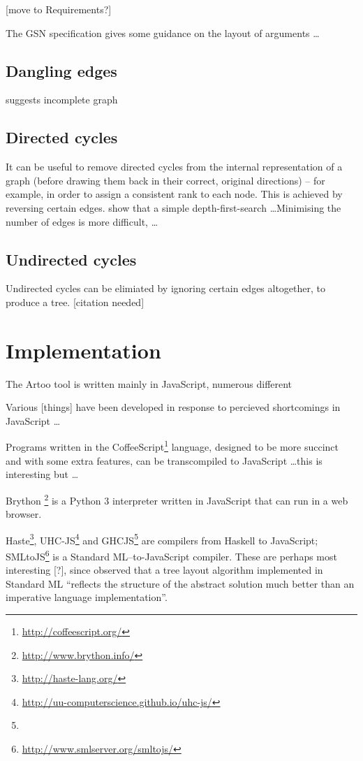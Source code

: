 [move to Requirements?]

The GSN specification \citep[section~2.2, pp.~26--27]{gsnstandard} gives some guidance on the layout of arguments \ldots



\subsection{Dangling edges}

suggests incomplete graph

\subsection{Directed cycles}

It can be useful to remove directed cycles from the internal representation of a graph
(before drawing them back in their correct, original directions)
-- for example, in order to assign a consistent rank to each node.
This is achieved by reversing certain edges.
\citet{gansner1993} show that a simple depth-first-search \ldots  Minimising the number of edges is more difficult, \citeauthor{gansner1993} \ldots

\subsection{Undirected cycles}

Undirected cycles can be elimiated by ignoring certain edges altogether, to produce a tree.  [citation needed]

\section{Implementation}

The Artoo tool is written mainly in JavaScript, numerous different 

Various [things] have been developed in response to percieved shortcomings in JavaScript \ldots

Programs written in the CoffeeScript\footnote{\url{http://coffeescript.org/}} language, designed to be more succinct and with some extra features, can be transcompiled to JavaScript \ldots this is interesting but \ldots

Brython \footnote{\url{http://www.brython.info/}} is a Python 3 interpreter written in JavaScript that can run in a web browser. 

Haste\footnote{\url{http://haste-lang.org/}}, UHC-JS\footnote{\url{http://uu-computerscience.github.io/uhc-js/}} and GHCJS\footnote{} are compilers from Haskell to JavaScript; SMLtoJS\footnote{\url{http://www.smlserver.org/smltojs/}} is a Standard ML--to-JavaScript compiler. These are perhaps most interesting [?], since \citet{kennedyfuntrees} observed that a tree layout algorithm implemented in Standard ML ``reflects the structure of the abstract solution much better than an imperative language implementation''.



